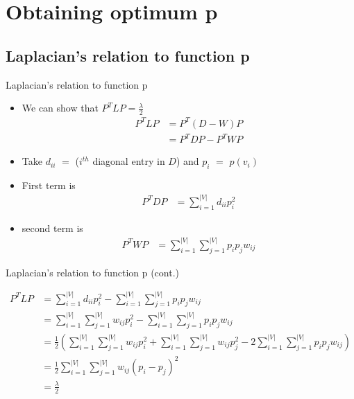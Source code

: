 \documentclass{beamer}
\begin{document}
\section{Obtaining optimum p}

\subsection{Laplacian's relation to function p}
\begin{frame}{Laplacian's relation to function p}

\begin{itemize}

	\item We can show that $P^TLP = \frac{\lambda}{2}$
  	\begin{align*}
  	P^TLP &= P^T(D - W)P \\ 
          &= P^TDP - P^TWP
  	\end{align*}
	\item Take $d_{ii}$ $=$ ($i^{th}$ diagonal entry in $D$) and $p_i$ $=$ $p(v_i)$
	\item First term is
    	\begin{align*}
        	P^TDP &= \sum_{i=1}^{|V|}d_{ii} p_{i}^2
        \end{align*}
	\item second term is
    	\begin{align*}
        	P^TWP &= \sum_{i=1}^{|V|} \sum_{j=1}^{|V|} p_{i} p_{j} w_{ij}
    	\end{align*}
        
\end{itemize}

\end{frame}



\begin{frame}{Laplacian's relation to function p (cont.)}

  \begin{align*}
  	P^TLP &= \sum_{i=1}^{|V|}d_{ii} p_{i}^2 - \sum_{i=1}^{|V|} \sum_{j=1}^{|V|} p_{i} p_{j} w_{ij} \\
          &= \sum_{i=1}^{|V|} \sum_{j=1}^{|V|} w_{ij} p_{i}^2 - \sum_{i=1}^{|V|} \sum_{j=1}^{|V|} p_{i} p_{j} w_{ij} \\
          &= \frac{1}{2} ( \sum_{i=1}^{|V|} \sum_{j=1}^{|V|} w_{ij} p_{i}^2 + \sum_{i=1}^{|V|} \sum_{j=1}^{|V|} w_{ij} p_{j}^2 - 2\sum_{i=1}^{|V|} \sum_{j=1}^{|V|} p_{i} p_{j} w_{ij} ) \\
          &= \frac{1}{2} \sum_{i=1}^{|V|} \sum_{j=1}^{|V|} w_{ij} (p_i - p_j)^2 \\
          &= \frac{\lambda}{2}
  \end{align*}

\end{frame}
\end{document}
